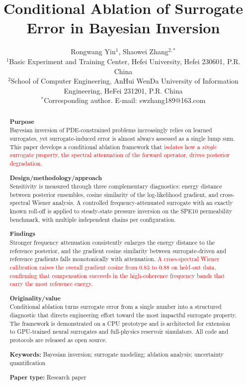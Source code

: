 \documentclass[12pt]{article}
\title{\bfseries Conditional Ablation of Surrogate Error in Bayesian Inversion}
\author{Rongwang Yin$^{1}$, Shaowei Zhang$^{2,*}$\\[4pt]
\small $^1$Basic Experiment and Training Center, Hefei University, Hefei 230601, P.R. China\\
\small $^2$School of Computer Engineering, AnHui WenDa University of Information Engineering, HeFei 231201, P.R. China\\
\small $^*$Corresponding author. E-mail: swzhang189@163.com}
\date{}
\newcommand{\add}[1]{\textcolor{red}{#1}}
\begin{document}
\maketitle

\begin{abstract}
\noindent\textbf{Purpose}\\
Bayesian inversion of PDE-constrained problems increasingly relies on learned surrogates, yet surrogate-induced error is almost always assessed as a single lump sum. This paper develops a conditional ablation framework that \add{isolates how a \emph{single} surrogate property, the spectral attenuation of the forward operator, drives posterior degradation}.

\noindent\textbf{Design/methodology/approach}\\
Sensitivity is measured through three complementary diagnostics: energy distance between posterior ensembles, cosine similarity of the log-likelihood gradient, and cross-spectral Wiener analysis. A controlled frequency-attenuated surrogate with an exactly known roll-off is applied to steady-state pressure inversion on the SPE10 permeability benchmark, with multiple independent chains per configuration.

\noindent\textbf{Findings}\\
Stronger frequency attenuation consistently enlarges the energy distance to the reference posterior, and the gradient cosine similarity between surrogate-driven and reference gradients falls monotonically with attenuation. \add{A cross-spectral Wiener calibration raises the overall gradient cosine from $0.83$ to $0.88$ on held-out data, confirming that compensation succeeds in the high-coherence frequency bands that carry the most reference energy.}

\noindent\textbf{Originality/value}\\
Conditional ablation turns surrogate error from a single number into a structured diagnostic that directs engineering effort toward the most impactful surrogate property. The framework is demonstrated on a CPU prototype and is architected for extension to GPU-trained neural surrogates and full-physics reservoir simulators. All code and protocols are released as open source.

\medskip
\noindent\textbf{Keywords:} Bayesian inversion; surrogate modeling; ablation analysis; uncertainty quantification

\medskip
\noindent\textbf{Paper type:} Research paper
\end{abstract}
\end{document}
